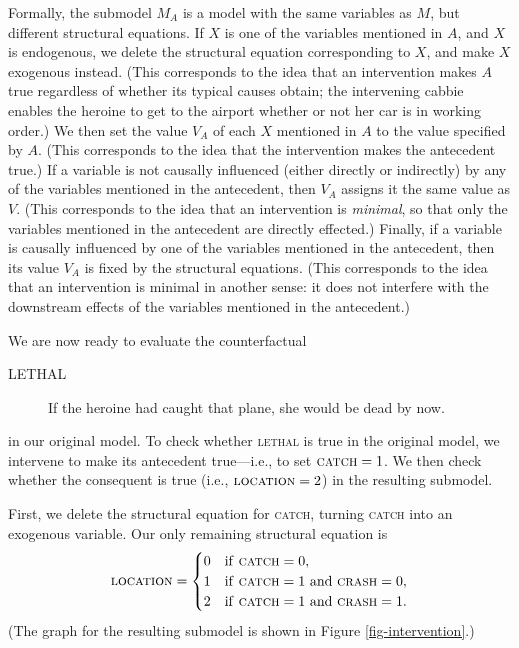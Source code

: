 Formally, the submodel $M_A$ is a model with the same variables as $M$, but different structural equations.  If $X$ is one of the variables mentioned in $A$, and $X$ is endogenous, we delete the structural equation corresponding to $X$, and make $X$ exogenous instead.  (This corresponds to the idea that an intervention makes $A$ true regardless of whether its typical causes obtain; the intervening cabbie enables the heroine to get to the airport whether or not her car is in working order.) We then set the value  $V_A$ of each $X$ mentioned in $A$  to the value specified by $A$. (This corresponds to the idea that the intervention makes the antecedent true.)  If a variable is not causally influenced (either directly or indirectly) by any of the variables mentioned in the antecedent, then $V_A$ assigns it the same value as $V$. (This corresponds to the idea that an intervention is \emph{minimal}, so that only the variables mentioned in the antecedent are directly effected.) Finally, if a variable is causally influenced by one of the variables mentioned in the antecedent, then its value $V_A$ is fixed by the structural equations.   (This corresponds to the idea that an intervention is minimal in another sense: it does not interfere with the downstream effects of the variables mentioned in the antecedent.)

We are now ready to evaluate the counterfactual
\begin{description}
\item[LETHAL] If the heroine had caught that plane, she would be dead by now.
\end{description}
in our original model.  To check whether \textsc{lethal} is true in the original model, we intervene to make its antecedent true---i.e., to set $\text{\textsc{catch}} = 1$.  We then check whether the consequent is true (i.e., $\text{\textsc{location}} = 2$) in the resulting submodel.

First, we delete the structural equation for \textsc{catch}, turning  \textsc{catch} into an exogenous variable. Our only remaining structural equation is
$$
\text{\textsc{location}} = 
  \begin{cases}
	0 & \text{if \textsc{catch}} = 0,\\
	1 & \text{if \textsc{catch}} = 1 \text{ and \textsc{crash}} = 0,\\
	2 & \text{if \textsc{catch}} = 1 \text{ and \textsc{crash}} = 1.\\
  \end{cases}
$$
(The graph for the resulting submodel is shown in Figure \ref{fig-intervention}.)

